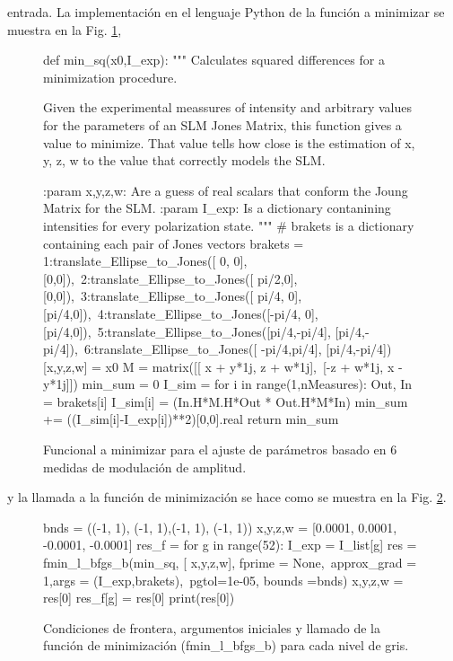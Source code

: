  entrada.  
La implementación en el lenguaje Python de la función a minimizar se
muestra en la Fig. \ref{fig:SLM_functional},  
\begin{figure}
\begin{python}
def min_sq(x0,I_exp):
    """ Calculates squared differences for a minimization procedure.

    Given the experimental meassures of intensity and arbitrary values for 
    the parameters of an SLM Jones Matrix, this function gives a value to
    minimize. That value tells how close is the estimation of x, y, z, w 
    to the value that correctly models the SLM.

    :param x,y,z,w: Are a guess of real scalars that conform the Joung Matrix for the SLM.
    :param I_exp: Is a dictionary contanining intensities for every polarization state.
    """
    # brakets is a dictionary containing each pair of Jones vectors
    brakets = {1:translate_Ellipse_to_Jones([ 0,   0],      [0,0]),\
           2:translate_Ellipse_to_Jones([ pi/2,0],      [0,0]),\
           3:translate_Ellipse_to_Jones([ pi/4, 0],    [pi/4,0]),\
           4:translate_Ellipse_to_Jones([-pi/4, 0],    [pi/4,0]),\
           5:translate_Ellipse_to_Jones([pi/4,-pi/4],   [pi/4,-pi/4]),\
           6:translate_Ellipse_to_Jones([ -pi/4,pi/4],  [pi/4,-pi/4])}
    [x,y,z,w] = x0
    M = matrix([[ x + y*1j, z + w*1j],\
                [-z + w*1j, x - y*1j]])
    min_sum = 0
    I_sim = {}
    for i in range(1,nMeasures):
        Out, In = brakets[i]
        I_sim[i] = (In.H*M.H*Out * Out.H*M*In)
        min_sum += ((I_sim[i]-I_exp[i])**2)[0,0].real    
    return min_sum
\end{python}
\caption{Funcional a minimizar para el ajuste de parámetros basado en
  6 medidas de modulación de amplitud.}
\label{fig:SLM_functional}
\end{figure}
y la llamada a la función de minimización se hace como se muestra en la
Fig. \ref{fig:SLM_minimization}.
\begin{figure}
\begin{python}
bnds = ((-1, 1), (-1, 1),(-1, 1), (-1, 1))
x,y,z,w = [0.0001, 0.0001, -0.0001, -0.0001] 
res_f = {}
for g in range(52):
    I_exp = I_list[g]
    res = fmin_l_bfgs_b(min_sq, [ x,y,z,w], fprime = None,\
                         approx_grad = 1,args = (I_exp,brakets),\
                         pgtol=1e-05, bounds =bnds)
    x,y,z,w = res[0]
    res_f[g] = res[0]
    print(res[0])
\end{python}
\caption{Condiciones de frontera, argumentos iniciales y llamado de la
función de minimización (fmin\_l\_bfgs\_b) para cada nivel de gris.}
\label{fig:SLM_minimization}
\end{figure}
